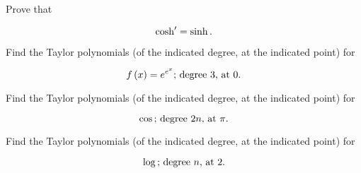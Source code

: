 \documentclass[12pt,letterpaper]{hmcpset}
\newcommand{\fx}{f \left( x \right) =}
\begin{document}
\begin{problem}[18.8.f]

    Prove that

    \[
        \cosh^\prime = \sinh.\\
    \]

\end{problem}

\begin{solution}

\end{solution}

\begin{problem}[20.1.ii]

    Find the Taylor polynomials (of the indicated degree, at the indicated point) for

    \[
        \fx e^{e^x}\text{; degree } 3\text{, at }0.\\
    \]

\end{problem}

\begin{solution}

\end{solution}

\begin{problem}[20.1.iv]

    Find the Taylor polynomials (of the indicated degree, at the indicated point) for

    \[
        \cos\text{; degree } 2n\text{, at }\pi.\\
    \]

\end{problem}

\begin{solution}

\end{solution}

\begin{problem}[20.1.vi]

    Find the Taylor polynomials (of the indicated degree, at the indicated point) for

    \[
        \log\text{; degree } n\text{, at }2.\\
    \]

\end{problem}

\begin{solution}

\end{solution}
\end{document}
